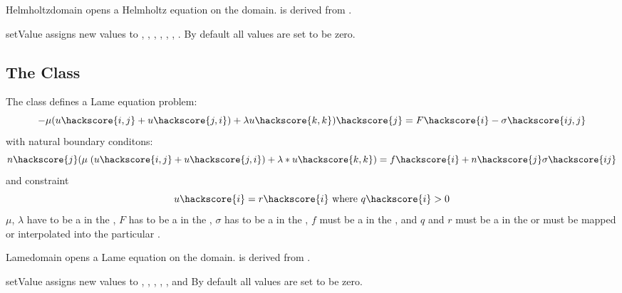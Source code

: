 \begin{classdesc}{Helmholtz}{domain}
opens a Helmholtz equation on the \Domain domain. \Helmholtz is derived from \LinearPDE.
\end{classdesc}
\begin{methoddesc}[Helmholtz]{setValue}{       }
assigns new values to , , , , , , . By default all values are set to be zero.
\end{methoddesc}

\subsection{The \Lame Class}
The \Lame class defines a Lame equation problem:
\begin{equation}\label{LE.1}
-\mu (u\hackscore{i,j}+u\hackscore{j,i})+\lambda u\hackscore{k,k})\hackscore{j} = F\hackscore{i}-\sigma\hackscore{ij,j}
\end{equation}
with natural boundary conditons:
\begin{equation}\label{LE.2}
n\hackscore{j}(\mu \; (u\hackscore{i,j}+u\hackscore{j,i})+\lambda*u\hackscore{k,k}) = f\hackscore{i}+n\hackscore{j}\sigma\hackscore{ij}
\end{equation}
and constraint
\begin{equation}\label{LE.3}
u\hackscore{i}=r\hackscore{i} \mbox{ where } q\hackscore{i}>0
\end{equation}
$\mu$, $\lambda$ have to be a \Scalar in the \Function,
$F$ has to be a \Vector in the \Function,
$\sigma$ has to be a \Tensor in the \Function,
$f$ must be a \Vector in  the \FunctionOnBoundary,
and $q$ and $r$ must be a \Vector in  the \SolutionFS or must be mapped or interpolated into the particular \FunctionSpace.

\begin{classdesc}{Lame}{domain}
opens a Lame equation on the \Domain domain. \Lame is derived from \LinearPDE.
\end{classdesc}
\begin{methoddesc}[Lame]{setValue}{       }
assigns new values to 
,
,
,
,
,
 and
By default all values are set to be zero.
\end{methoddesc}


